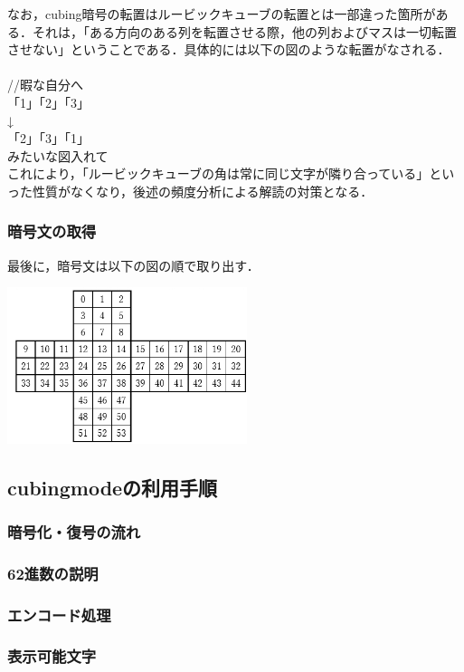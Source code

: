 \documentclass{jsarticle}
\begin{document}
なお，cubing暗号の転置はルービックキューブの転置とは一部違った箇所がある．それは，「ある方向のある列を転置させる際，他の列およびマスは一切転置させない」ということである．具体的には以下の図のような転置がなされる．\\
\\
//暇な自分へ\\
「1」「2」「3」\\
↓\\
「2」「3」「1」\\
みたいな図入れて\\

これにより，「ルービックキューブの角は常に同じ文字が隣り合っている」といった性質がなくなり，後述の頻度分析による解読の対策となる．


\subsubsection{暗号文の取得}
最後に，暗号文は以下の図の順で取り出す．
\begin{center}
  \includegraphics[width=7cm]{./tex_pic/seq.jpg}\\
\end{center}
\subsection{cubingmodeの利用手順}
\subsubsection{暗号化・復号の流れ}
\subsubsection{62進数の説明}
\subsubsection{エンコード処理}
\subsubsection{表示可能文字}
\end{document}
